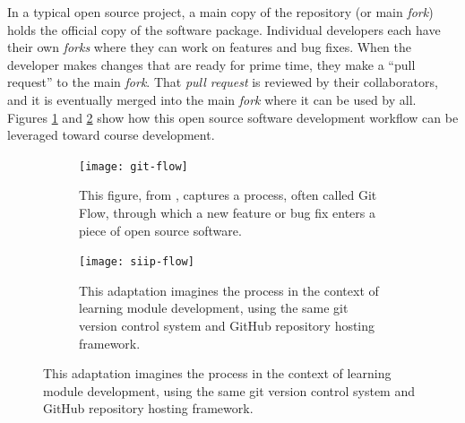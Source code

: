 \documentclass[11pt]{article}
\begin{document}
          In a typical open source project, a main copy of the 
          repository (or main \emph{fork}) holds the 
          official copy of the software package. Individual developers each have their own 
          \emph{forks} where they can work on features and 
          bug fixes. When the developer makes changes that are ready for prime 
          time, they make a ``pull request'' to the main \emph{fork}. That 
          \emph{pull request} is 
          reviewed by their collaborators, and it is eventually merged into the 
          main \emph{fork} where it can be used by all. Figures 
          \ref{fig:sub1} and \ref{fig:sub2} show how this open source software 
          development workflow
          can be leveraged toward course development.

          \begin{figure}
                  \centering
                  \begin{subfigure}{.4\textwidth}
                            \centering
                              \texttt{[image: git-flow]}
        \caption{This figure, from \cite{scopatz_effective_2015}, captures a 
                          process, often called Git Flow, through which a new 
                          feature or bug fix enters a piece of open source 
                          software.}
                                  \label{fig:sub1}
                  \end{subfigure}\hfill%
                  \begin{subfigure}{.4\textwidth}
                            \centering
                              \texttt{[image: siip-flow]}
  \caption{This adaptation imagines the process in the context of learning module development, using the same git version control system and GitHub repository hosting framework.}
                                  \label{fig:sub2}
                  \end{subfigure}
                  \label{fig:test}
          \end{figure}
          \FloatBarrier

\end{document}
